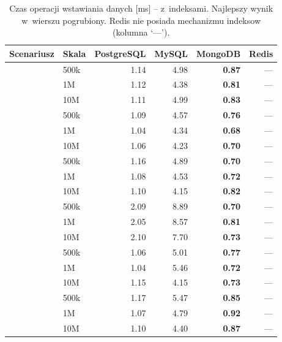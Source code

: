 \begin{table}[H]
\centering
\caption{Czas operacji wstawiania danych [ms] -- z~indeksami. Najlepszy wynik w~wierszu pogrubiony. Redis nie posiada mechanizmu indeksow (kolumna `---').}
\label{tab:create_idx}
\small
\begin{tabular}{@{}llrrrr@{}}
\toprule
\textbf{Scenariusz} & \textbf{Skala} & \textbf{PostgreSQL} & \textbf{MySQL} & \textbf{MongoDB} & \textbf{Redis} \\
\midrule
{}
 & 500k & 1.14 & 4.98 & \textbf{0.87} & --- \\
 & 1M & 1.12 & 4.38 & \textbf{0.81} & --- \\
 & 10M & 1.11 & 4.99 & \textbf{0.83} & --- \\
\midrule
{}
 & 500k & 1.09 & 4.57 & \textbf{0.76} & --- \\
 & 1M & 1.04 & 4.34 & \textbf{0.68} & --- \\
 & 10M & 1.06 & 4.23 & \textbf{0.70} & --- \\
\midrule
{}
 & 500k & 1.16 & 4.89 & \textbf{0.70} & --- \\
 & 1M & 1.08 & 4.53 & \textbf{0.72} & --- \\
 & 10M & 1.10 & 4.15 & \textbf{0.82} & --- \\
\midrule
{}
 & 500k & 2.09 & 8.89 & \textbf{0.70} & --- \\
 & 1M & 2.05 & 8.57 & \textbf{0.81} & --- \\
 & 10M & 2.10 & 7.70 & \textbf{0.73} & --- \\
\midrule
{}
 & 500k & 1.06 & 5.01 & \textbf{0.77} & --- \\
 & 1M & 1.04 & 5.46 & \textbf{0.72} & --- \\
 & 10M & 1.15 & 4.15 & \textbf{0.73} & --- \\
\midrule
{}
 & 500k & 1.17 & 5.47 & \textbf{0.85} & --- \\
 & 1M & 1.07 & 4.79 & \textbf{0.92} & --- \\
 & 10M & 1.10 & 4.40 & \textbf{0.87} & --- \\
\bottomrule
\end{tabular}
\end{table}
